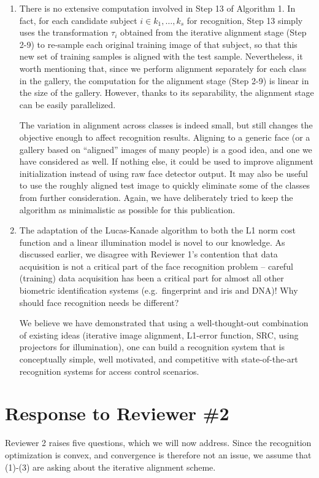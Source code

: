\documentclass[11pt]{article}
\begin{document}
\begin{enumerate}
\item  There is no extensive computation involved in
    Step 13 of Algorithm 1. In fact, for each candidate
    subject $i\in {k_1, \ldots, k_s}$ for recognition, Step
    13 simply uses the transformation $\tau_i$ obtained
    from the iterative alignment stage (Step 2-9) to
    re-sample each original training
    image of that subject, so that this new set of training
    samples is aligned with the test sample. Nevertheless,
    it worth mentioning that, since we perform alignment
    separately for each class in the gallery, the
    computation for the alignment stage (Step 2-9) is
    linear in the size of the gallery. However, thanks to
    its separability, the alignment stage can be easily
    parallelized.

    The variation in alignment across classes is indeed
    small, but still changes the objective enough to affect
    recognition results. Aligning to a generic face (or a
    gallery based on ``aligned'' images of many people) is
    a good idea, and one we have considered as well.  If
    nothing else, it could be used to improve alignment
    initialization instead of using raw face detector
    output.  It may also be useful to use the roughly
    aligned test image to quickly eliminate some of the
    classes from further consideration.  Again, we have
    deliberately tried to keep the algorithm as minimalistic
    as possible for this publication.

\item The adaptation of the Lucas-Kanade algorithm to both the L1 norm cost
function and a linear illumination model is novel to our knowledge.  As
discussed earlier, we disagree with Reviewer 1's contention that data
acquisition is not a critical part of the face recognition problem -- careful (training)
data acquisition has been a critical part for almost all other biometric identification
systems (e.g.\ fingerprint and iris and DNA)! Why should face recognition needs be different?

We believe we have demonstrated that using a well-thought-out combination of existing ideas
(iterative image alignment, L1-error function, SRC, using projectors for
illumination), one can build a recognition system that is conceptually simple, well
motivated, and competitive with state-of-the-art recognition systems for access
control scenarios.

\end{enumerate}

\section{Response to Reviewer \#2}
Reviewer 2 raises five questions, which we will now address.  Since the
recognition optimization is convex, and convergence is therefore not an issue, we assume
that (1)-(3) are asking about the iterative alignment scheme.
\end{document}

